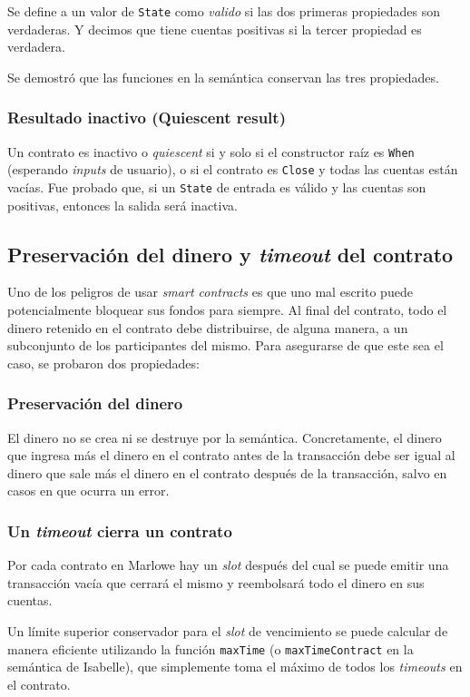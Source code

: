 \documentclass[12pt]{book}
\begin{document}
Se define a un valor de \texttt{State} como \textit{valido} si las dos primeras propiedades son verdaderas. Y decimos que tiene cuentas positivas si la tercer propiedad es verdadera.

Se demostró que las funciones en la semántica conservan las tres propiedades.

\subsubsection{Resultado inactivo (Quiescent result)}
Un contrato es inactivo o \textit{quiescent} si y solo si el constructor raíz es \texttt{When} (esperando \textit{inputs} de usuario), o si el contrato es \texttt{Close} y todas las cuentas están vacías. Fue probado que, si un \texttt{State} de entrada es válido y las cuentas son positivas, entonces la salida será inactiva.

\subsection{Preservación del dinero y \textit{timeout} del contrato}

Uno de los peligros de usar \textit{smart contracts} es que uno mal escrito puede potencialmente bloquear sus fondos para siempre. Al final del contrato, todo el dinero retenido en el contrato debe distribuirse, de alguna manera, a un subconjunto de los participantes del mismo. Para asegurarse de que este sea el caso, se probaron dos propiedades:

\subsubsection{Preservación del dinero}
El dinero no se crea ni se destruye por la semántica. Concretamente, el dinero que ingresa más el dinero en el contrato antes de la transacción debe ser igual al dinero que sale más el dinero en el contrato después de la transacción, salvo en casos en que ocurra un error.

\subsubsection{Un \textit{timeout} cierra un contrato} 
Por cada contrato en Marlowe hay un \textit{slot} después del cual se puede emitir una transacción vacía que cerrará el mismo y reembolsará todo el dinero en sus cuentas.

Un límite superior conservador para el \textit{slot} de vencimiento se puede calcular de manera eficiente utilizando la función \texttt{maxTime} (o \texttt{maxTimeContract} en la semántica de Isabelle), que simplemente toma el máximo de todos los \textit{timeouts} en el contrato.
\end{document}
